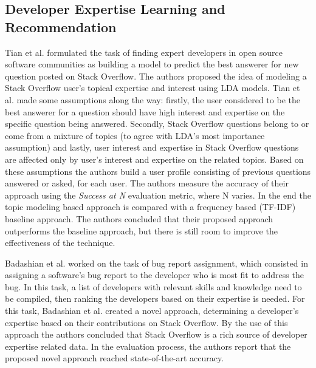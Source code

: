     \subsection{Developer Expertise Learning and Recommendation}
        
        Tian et al. \cite{tian2013predicting} formulated the task of finding expert developers in open source software communities as building a model to predict the best answerer for new question posted on Stack Overflow. The authors proposed the idea of modeling a Stack Overflow user's topical expertise and interest using LDA models. Tian et al. made some assumptions along the way: firstly, the user considered to be the best answerer for a question should have high interest and expertise on the specific question being answered. Secondly, Stack Overflow questions belong to or come from a mixture of topics (to agree with LDA's most importance assumption) and lastly, user interest and expertise in Stack Overflow questions are affected only by user's interest and expertise on the related topics. Based on these assumptions the authors build a user profile consisting of previous questions answered or asked, for each user. The authors measure the accuracy of their approach using the \emph{Success at N} evaluation metric, where N varies. In the end the topic modeling based approach is compared with a frequency based (TF-IDF) baseline approach. The authors concluded that their proposed approach outperforms the baseline approach, but there is still room to improve the effectiveness of the technique.
        
        Badashian et al. \cite{badashian2016crowdsourced} worked on the task of bug report assignment, which consisted in assigning a software's bug report to the developer who is most fit to address the bug. In this task, a list of developers with relevant skills and knowledge need to be compiled, then ranking the developers based on their expertise is needed. For this task, Badashian et al. created a novel approach, determining a developer’s expertise based on their contributions on Stack Overflow. By the use of this approach the authors concluded that Stack Overflow is a rich source of developer expertise related data. In the evaluation process, the authors report that the proposed novel approach reached state-of-the-art accuracy.
        
